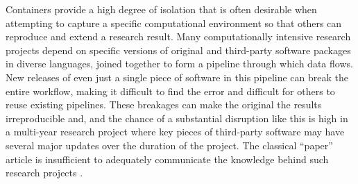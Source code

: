 \label{compendia}

Containers provide a high degree of isolation that is often desirable
when attempting to capture a specific computational environment so that
others can reproduce and extend a research result. Many computationally
intensive research projects depend on specific versions of original and
third-party software packages in diverse languages, joined together to
form a pipeline through which data flows. New releases of even just a
single piece of software in this pipeline can break the entire workflow,
making it difficult to find the error and difficult for others to reuse
existing pipelines. These breakages can make the original the results
irreproducible and, and the chance of a substantial disruption like this
is high in a multi-year research project where key pieces of third-party
software may have several major updates over the duration of the
project. The classical ``paper'' article is insufficient to adequately
communicate the knowledge behind such research projects
\citep[cf.][]{donoho_invitation_2010,marwick_how_2015}.

